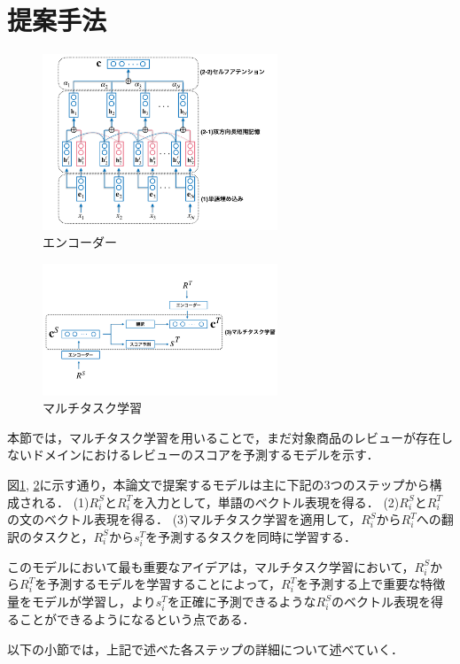 \documentclass[dvipdfmx,twocolumn,10.5pt]{jsarticle}
\begin{document}
\section{提案手法}\label{suggestion}
\begin{figure}[tb]
	\centering
	\includegraphics[width=7cm]{images/encoder2.pdf} 
	\caption{エンコーダー}
	\label{encoder}
\end{figure}
\begin{figure}[tb]
	\centering
	\includegraphics[width=7cm]{images/multitaskLearning.pdf} 
	\caption{マルチタスク学習}
	\label{multitaskLearning}
\end{figure}
本節では，マルチタスク学習を用いることで，まだ対象商品のレビューが存在しないドメインにおけるレビューのスコアを予測するモデルを示す．

図\ref{encoder}, \ref{multitaskLearning}に示す通り，本論文で提案するモデルは主に下記の3つのステップから構成される．
(1)$R^S_i$と$R^T_i$を入力として，単語のベクトル表現を得る．
(2)$R^S_i$と$R^T_i$の文のベクトル表現を得る．
(3)マルチタスク学習を適用して，$R^S_i$から$R^T_i$への翻訳のタスクと，$R^S_i$から$s_i^T$を予測するタスクを同時に学習する．

このモデルにおいて最も重要なアイデアは，マルチタスク学習において，$R^S_i$から$R^T_i$を予測するモデルを学習することによって，$R_i^T$を予測する上で重要な特徴量をモデルが学習し，より$s_i^T$を正確に予測できるような$R_i^S$のベクトル表現を得ることができるようになるという点である．

以下の小節では，上記で述べた各ステップの詳細について述べていく．
\end{document}
